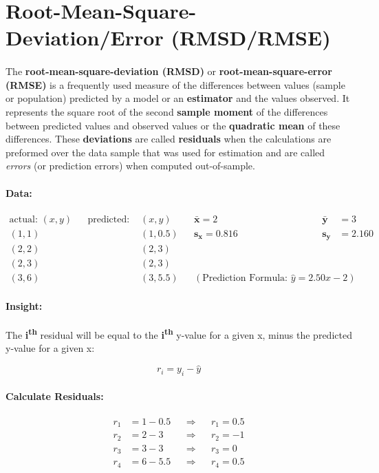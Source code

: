 \documentclass[12pt]{article}
\begin{document}
\section*{Root-Mean-Square-Deviation/Error (RMSD/RMSE)}

\paragraph{}
	The \textbf{root-mean-square-deviation (RMSD)} or \textbf{root-mean-square-error (RMSE)} is a frequently used measure of the differences between values (sample or population) predicted by a model or an \textbf{estimator} and the values observed. It represents the square root of the second \textbf{sample moment} of the differences between predicted values and observed values or the \textbf{quadratic mean} of these differences. These \textbf{deviations} are called \textbf{residuals} when the calculations are preformed over the data sample that was used for estimation and are called \emph{errors} (or prediction errors) when computed out-of-sample.

\paragraph{Data:}

\begin{align*} %
	\text{actual: }(x, y) && \text{predicted: } & (x, y) &&
	\mathbf{\bar{x}} = 2 & \mathbf{\bar{y}} & = 3 \\
	(1, 1) && & (1, 0.5) && \mathbf{s_{x}} = 0.816 & \mathbf{s_{y}} & = 2.160 \\
	(2, 2) && & (2, 3) \\
	(2, 3) && & (2, 3) \\
	(3, 6) && & (3, 5.5) && (\text{Prediction Formula: }\hat{y} = 2.50x - 2)
\end{align*}

\paragraph{Insight:}
The \textbf{i\textsuperscript{th}} residual will be equal to the \textbf{i\textsuperscript{th}} y-value for a given x, minus the predicted y-value for a given x:

\begin{equation}
	r_{i} = y_{i} - \hat{y}
\end{equation}

\paragraph{Calculate Residuals:}
\begin{align*}
	r_{1} & = 1 - 0.5 && \Rightarrow && r_{1} = 0.5 \\
	r_{2} & = 2 - 3 && \Rightarrow && r_{2} = -1 \\
	r_{3} & = 3 - 3 && \Rightarrow &&  r_{3} = 0 \\
	r_{4} & = 6 - 5.5 && \Rightarrow &&  r_{4} = 0.5
\end{align*}
\end{document}
